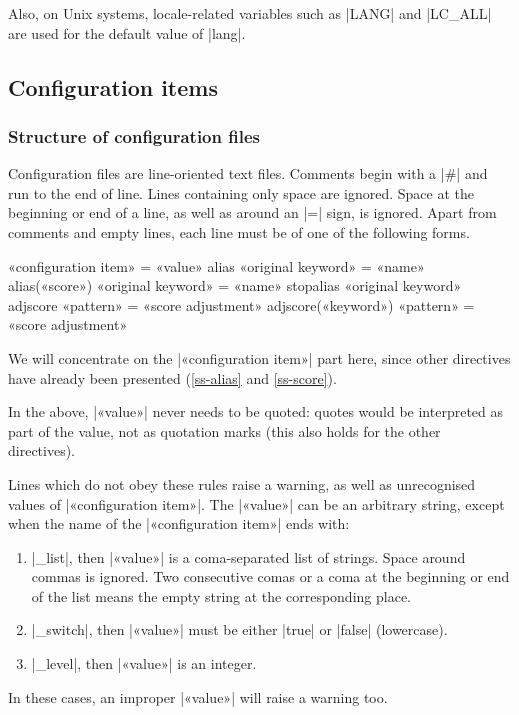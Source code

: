 \documentclass[a4paper,oneside]{scrartcl}
\makeatletter
\newenvironment{htcode}
  {\SaveVerbatim[samepage, gobble=2]{verbmat}}
  {
    \endSaveVerbatim
    \par\medskip\noindent\hspace*{\parindent}%
    \BUseVerbatim{verbmat}%
    \par\medskip\@endpetrue
  }
\makeatother
\begin{document}
Also, on Unix systems, locale-related variables such as |LANG| and |LC_ALL|
are used for the default value of |lang|.

\subsection{Configuration items}\label{ss-conf}

\subsubsection{Structure of configuration files}\label{sss-sonf-struct}

Configuration files are line-oriented text files. Comments begin with a |#|
and run to the end of line. Lines containing only space are ignored. Space at
the beginning or end of a line, as well as around an |=| sign, is ignored.
Apart from comments and empty lines, each line must be of one of the following
forms.

\begin{htcode}
  «configuration item» = «value»
  alias «original keyword» = «name»
  alias(«score») «original keyword» = «name»
  stopalias «original keyword»
  adjscore «pattern» = «score adjustment»
  adjscore(«keyword») «pattern» = «score adjustment»
\end{htcode}

We will concentrate on the |«configuration item»| part here, since other
directives have already been presented (\ref{ss-alias} and \ref{ss-score}).

In the above, |«value»|  never needs to be quoted: quotes would be interpreted
as part of the value, not as quotation marks (this also holds for the other
directives).

Lines which do not obey these rules raise a warning, as well as unrecognised
values of |«configuration item»|. The |«value»| can be an arbitrary string,
except when the name of the |«configuration item»| ends with:
\begin{enumerate}
  \item |_list|, then |«value»| is a coma-separated list of strings. Space
    around commas is ignored. Two consecutive comas or a coma at the beginning
    or end of the list means the empty string at the corresponding place.
  \item |_switch|, then |«value»| must be either |true| or |false|
    (lowercase).
  \item |_level|, then |«value»| is an integer.
\end{enumerate}
In these cases, an improper |«value»| will raise a warning too.
\end{document}
